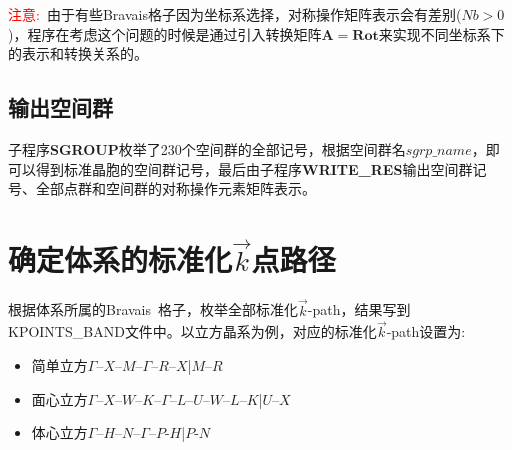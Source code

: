 \documentclass{article}      %
\begin{document}
\textcolor{red}{注意:~}由于有些\textrm{Bravais}格子因为坐标系选择，对称操作矩阵表示会有差别($\mathit{Nb}>0$)，程序在考虑这个问题的时候是通过引入转换矩阵$\mathbf{A}=\mathbf{Rot}$来实现不同坐标系下的表示和转换关系的。
\subsection{输出空间群}
子程序\textbf{SGROUP}枚举了230个空间群的全部记号，根据空间群名$\mathit{sgrp\_name}$，即可以得到标准晶胞的空间群记号，最后由子程序\textbf{WRITE\_RES}输出空间群记号、全部点群和空间群的对称操作元素矩阵表示。

\section{确定体系的标准化$\vec k$点路径}
根据体系所属的\textrm{Bravais~}格子，枚举全部标准化$\vec k$-\textrm{path}，结果写到\textrm{KPOINTS\_BAND}文件中。以立方晶系为例，对应的标准化$\vec k$-\textrm{path}设置为:~
\begin{itemize}
	\item 简单立方\quad $\Gamma$–$X$–$M$–$\Gamma$–$R$–$X$|$M$–$R$
	\item 面心立方\quad $\Gamma$–$X$–$W$–$K$–$\Gamma$–$L$–$U$–$W$–$L$–$K$|$U$–$X$
	\item 体心立方\quad $\Gamma$–$H$–$N$–$\Gamma$–$P$-$H$|$P$-$N$
\end{itemize}




\end{document}
